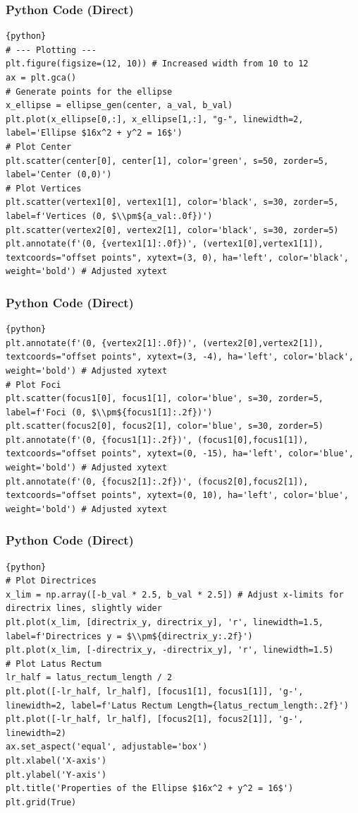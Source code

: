 \documentclass{beamer}
\begin{document}
\begin{frame}[fragile]
\frametitle{Python Code (Direct)}
\begin{lstlisting}{python}
# --- Plotting ---
plt.figure(figsize=(12, 10)) # Increased width from 10 to 12
ax = plt.gca()
# Generate points for the ellipse
x_ellipse = ellipse_gen(center, a_val, b_val)
plt.plot(x_ellipse[0,:], x_ellipse[1,:], "g-", linewidth=2, label='Ellipse $16x^2 + y^2 = 16$')
# Plot Center
plt.scatter(center[0], center[1], color='green', s=50, zorder=5, label='Center (0,0)')
# Plot Vertices
plt.scatter(vertex1[0], vertex1[1], color='black', s=30, zorder=5, label=f'Vertices (0, $\\pm${a_val:.0f})')
plt.scatter(vertex2[0], vertex2[1], color='black', s=30, zorder=5)
plt.annotate(f'(0, {vertex1[1]:.0f})', (vertex1[0],vertex1[1]), textcoords="offset points", xytext=(3, 0), ha='left', color='black', weight='bold') # Adjusted xytext
\end{lstlisting}
\end{frame}

\begin{frame}[fragile]
\frametitle{Python Code (Direct)}
\begin{lstlisting}{python}
plt.annotate(f'(0, {vertex2[1]:.0f})', (vertex2[0],vertex2[1]), textcoords="offset points", xytext=(3, -4), ha='left', color='black', weight='bold') # Adjusted xytext
# Plot Foci
plt.scatter(focus1[0], focus1[1], color='blue', s=30, zorder=5, label=f'Foci (0, $\\pm${focus1[1]:.2f})')
plt.scatter(focus2[0], focus2[1], color='blue', s=30, zorder=5)
plt.annotate(f'(0, {focus1[1]:.2f})', (focus1[0],focus1[1]), textcoords="offset points", xytext=(0, -15), ha='left', color='blue', weight='bold') # Adjusted xytext
plt.annotate(f'(0, {focus2[1]:.2f})', (focus2[0],focus2[1]), textcoords="offset points", xytext=(0, 10), ha='left', color='blue', weight='bold') # Adjusted xytext
\end{lstlisting}
\end{frame}

\begin{frame}[fragile]
\frametitle{Python Code (Direct)}
\begin{lstlisting}{python}
# Plot Directrices
x_lim = np.array([-b_val * 2.5, b_val * 2.5]) # Adjust x-limits for directrix lines, slightly wider
plt.plot(x_lim, [directrix_y, directrix_y], 'r', linewidth=1.5, label=f'Directrices y = $\\pm${directrix_y:.2f}')
plt.plot(x_lim, [-directrix_y, -directrix_y], 'r', linewidth=1.5)
# Plot Latus Rectum
lr_half = latus_rectum_length / 2
plt.plot([-lr_half, lr_half], [focus1[1], focus1[1]], 'g-', linewidth=2, label=f'Latus Rectum Length={latus_rectum_length:.2f}')
plt.plot([-lr_half, lr_half], [focus2[1], focus2[1]], 'g-', linewidth=2)
ax.set_aspect('equal', adjustable='box')
plt.xlabel('X-axis')
plt.ylabel('Y-axis')
plt.title('Properties of the Ellipse $16x^2 + y^2 = 16$')
plt.grid(True)
\end{lstlisting}
\end{frame}
\end{document}
